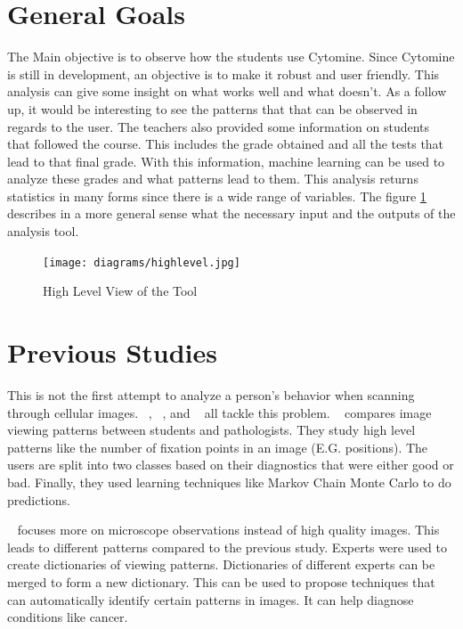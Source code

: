 \documentclass[a4paper,11pt]{report}
\numberwithin{figure}{chapter} %
\begin{document}
\section{General Goals}


    The Main objective is to observe how the students use Cytomine.
    Since Cytomine is still in development, an objective is to make it robust and user friendly.
    This analysis can give some insight on what works well and what doesn't.
    As a follow up, it would be interesting to see the patterns that that can be observed in regards to the user.
    The teachers also provided some information on students that followed the course.
    This includes the grade obtained and all the tests that lead to that final grade.
    With this information, machine learning can be used to analyze these grades and what patterns lead to them.
    This analysis returns statistics in many forms since there is a wide range of variables.
    The figure \ref{fig:highlevel} describes in a more general sense what the necessary input and the outputs of the analysis tool.

      \begin{figure}[H]
      \centering
      \texttt{[image: diagrams/highlevel.jpg]}
      \caption{High Level View of the Tool}
      \label{fig:highlevel}
      \end{figure}

\section{Previous Studies}

This is not the first attempt to analyze a person's behavior when scanning through cellular images.
~\cite{pathedex}, ~\cite{pathexams}, and ~\cite{pathinterations} all tackle this problem.
~\cite{pathedex} compares image viewing patterns between students and pathologists.
They study high level patterns like the number of fixation points in an image (E.G. positions).
The users are split into two classes based on their diagnostics that were either good or bad.
Finally, they used learning techniques like Markov Chain Monte Carlo to do predictions.

~\cite{pathinterations} focuses more on microscope observations instead of high quality images.
This leads to different patterns compared to the previous study.
Experts were used to create dictionaries of viewing patterns.
Dictionaries of different experts can be merged to form a new dictionary.
This can be used to propose techniques that can automatically identify certain patterns in images.
It can help diagnose conditions like cancer.
\end{document}
